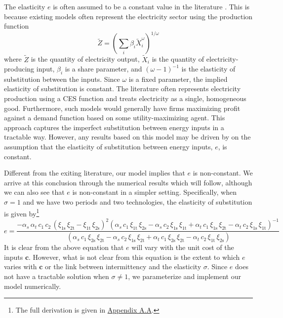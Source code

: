 \documentclass[11pt,a4paper,leqno]{extarticle}
\begin{document}
	The elasticity $e$ is often assumed to be a constant value in the literature \citep{Pap}. This is because existing models often represent the electricity sector using the production function
	\begin{equation}
	\tilde{Z} = \left( \sum_i \beta_i \tilde{X}_i^\omega \right)^{1/\omega}
	\end{equation} 
	where   $\tilde{Z}$ is the quantity of electricity output, $\tilde{X}_i$ is the quantity of electricity-producing input, $\beta_i$ is a share parameter, and $(\omega-1)^{-1} $ is the elasticity of substitution between the inputs. Since $\omega$ is a fixed parameter, the implied elasticity of substitution is constant. The literature often represents electricity production using a CES function and treats electricity as a single, homogeneous good. Furthermore, such models would generally have firms maximizing profit against a  demand function based on some utility-maximizing agent. This approach captures the imperfect substitution between energy inputs in a tractable way. However, any results based on this model may be driven by on the assumption that the  elasticity of substitution between energy inputs, $e$, is constant. 
	
	Different from the exiting literature, our model implies that $e$ is non-constant. We arrive at this conclusion through the numerical results which will follow, although we can also see that $e$ is non-constant in a simpler setting. Specifically, when $\sigma = 1$ and we have two periods and two technologies, the elasticity of substitution is given by\footnote{The full derivation is given in  \hyperref[sec:EOS_derivation]{Appendix A.A}.}
	\begin{equation}\label{eq:eosmath}
	e = 
	\frac{-\alpha _{s}\,\alpha _{t}\,c_{1}\,c_{2}\,{\left(\xi _{\mathrm{1s}}\,\xi _{\mathrm{2t}}-\xi _{\mathrm{1t}}\,\xi _{\mathrm{2s}}\right)}^2 \left(\alpha _{s}\,c_{1}\,\xi _{\mathrm{1t}}\,\xi _{\mathrm{2s}}-\alpha _{s}\,c_{2}\,\xi _{\mathrm{1s}}\,\xi _{\mathrm{1t}}+\alpha _{t}\,c_{1}\,\xi _{\mathrm{1s}}\,\xi _{\mathrm{2t}}-\alpha _{t}\,c_{2}\,\xi _{\mathrm{1s}}\,\xi _{\mathrm{1t}}\right)^{-1}}{
		\,\left(\alpha _{s}\,c_{1}\,\xi _{\mathrm{2s}}\,\xi _{\mathrm{2t}}-\alpha _{s}\,c_{2}\,\xi _{\mathrm{1s}}\,\xi _{\mathrm{2t}}+\alpha _{t}\,c_{1}\,\xi _{\mathrm{2s}}\,\xi _{\mathrm{2t}}-\alpha _{t}\,c_{2}\,\xi _{\mathrm{1t}}\,\xi _{\mathrm{2s}}\right)
	}
	\end{equation}
	It is clear from the above equation that $e$ will vary with the unit cost of the inputs $\mathbf{c}$. However, what is not clear from this equation is the extent to which $e$ varies with $\mathbf{c}$ or the link between intermittency and the elasticity $\sigma$. Since $e$ does not have a tractable solution when $\sigma \neq 1$, we parameterize and implement our model numerically. 
	
\end{document}
